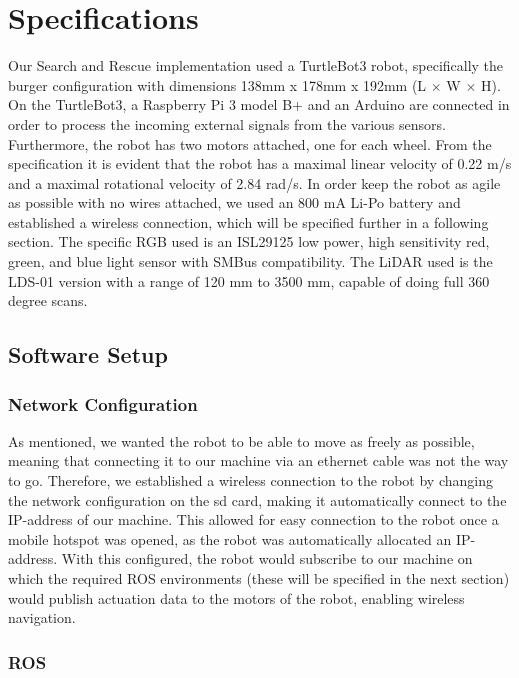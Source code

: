 \documentclass[conference]{IEEEtran}
\begin{document}
\section{Specifications}
Our Search and Rescue implementation used a TurtleBot3 robot, specifically the burger configuration with dimensions 138mm x 178mm x 192mm (L $\times$ W $\times$ H)\cite{b1}.
On the TurtleBot3, a Raspberry Pi 3 model B+ and an Arduino are connected in order to process the incoming external signals from the various sensors.
Furthermore, the robot has two motors attached, one for each wheel. From the specification it is evident that the robot has a maximal linear velocity of 0.22 m/s
and a maximal rotational velocity of 2.84 rad/s. In order keep the robot as agile as possible with no wires attached, we used an 800 mA Li-Po battery and established a wireless connection, which will be specified further in a following section.
The specific RGB used is an ISL29125 low power, high sensitivity red, green, and blue light sensor with SMBus compatibility\cite{b2}.
The LiDAR used is the LDS-01 version with a range of 120 mm to 3500 mm, capable of doing full 360 degree scans. \cite{b3}

\subsection{Software Setup}

\subsubsection{Network Configuration}
As mentioned, we wanted the robot to be able to move as freely as possible, meaning that connecting it to our machine via an ethernet cable was not the way to go.
Therefore, we established a wireless connection to the robot by changing the network configuration on the sd card, making it automatically connect to the IP-address of our machine.
This allowed for easy connection to the robot once a mobile hotspot was opened, as the robot was automatically allocated an IP-address.
With this configured, the robot would subscribe to our machine on which the required ROS environments (these will be specified in the next section) would publish actuation data to the motors of the robot, enabling wireless navigation.

\subsubsection{ROS}
\end{document}
